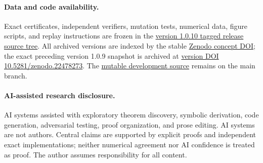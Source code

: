 \documentclass[11pt]{article}
\theoremstyle{definition}
\newcommand{\1}{\mathbf 1}
\begin{document}
\paragraph{Data and code availability.}
Exact certificates, independent verifiers, mutation tests, numerical data,
figure scripts, and replay instructions are frozen in the
\href{https://github.com/AlecKriebel/Math/tree/maximally-collective-stable-turing-v1.0.10/maximally_collective_stable_turing_patterns_binary_complex_mass_action_networks}{version 1.0.10 tagged release source tree}.
All archived versions are indexed by the stable
\href{https://doi.org/10.5281/zenodo.21753404}{Zenodo concept DOI}; the exact
preceding version 1.0.9 snapshot is archived at
\href{https://doi.org/10.5281/zenodo.22478273}{version DOI 10.5281/zenodo.22478273}.
The \href{https://github.com/AlecKriebel/Math/tree/main/maximally_collective_stable_turing_patterns_binary_complex_mass_action_networks}{mutable development source} remains on the main branch.

\paragraph{AI-assisted research disclosure.}
AI systems assisted with exploratory theorem discovery, symbolic derivation,
code generation, adversarial testing, proof organization, and prose editing.
AI systems are not authors.  Central claims are supported by explicit proofs
and independent exact implementations; neither numerical agreement nor AI
confidence is treated as proof.  The author assumes responsibility for all
content.

\begingroup
\renewcommand*{\bibfont}{\footnotesize}
\sloppy
\printbibliography
\endgroup
\end{document}
